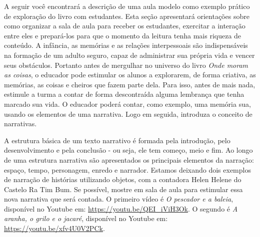 \documentclass[11pt]{extarticle}
\begin{document}
A seguir você encontrará a descrição de uma aula modelo como exemplo prático de exploração do livro com estudantes. Esta seção apresentará orientações sobre como organizar a sala de aula para receber os estudantes, exercitar a interação entre eles e prepará-los para que o momento da leitura tenha mais riqueza de conteúdo. A infância, as memórias e as relações interpessoais são indispensáveis na formação de um adulto seguro, capaz de administrar sua própria vida e vencer seus obstáculos. Portanto antes de mergulhar no universo do livro \textit{Onde moram as coisas}, o educador pode estimular os alunos a explorarem, de forma criativa, as memórias, as coisas e cheiros que fazem parte dela. Para isso, antes de mais nada, estimule a turma a contar de forma descontraída alguma lembrança que tenha marcado sua vida. O educador poderá contar, como exemplo, uma memória sua, usando os elementos de uma narrativa. Logo em seguida, introduza o conceito de narrativas. 

A estrutura básica de um texto narrativo é formada pela introdução, pelo desenvolvimento e pela conclusão - ou seja, ele tem começo, meio e fim. Ao longo de uma estrutura narrativa são apresentados os principais elementos da narração: espaço, tempo, personagem, enredo e narrador. Estamos deixando dois exemplos de narração de histórias utilizando objetos, com a contadora Helen Helene do Castelo Ra Tim Bum. Se possível, mostre em sala de aula para estimular essa nova narrativa que será contada. O primeiro vídeo é \textit{O pescador e a baleia}, disponível no Youtube em: \url{https://youtu.be/QEI_iViH3Ok}. O segundo é \textit{A aranha, o grilo e o jacaré}, disponível no Youtube em: \url{https://youtu.be/xfv4U0V2PCk}. 

\end{document}
